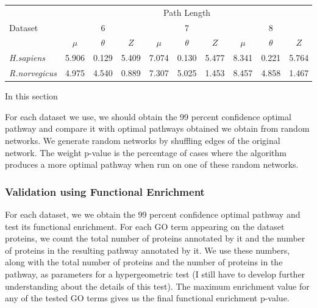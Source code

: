 \documentclass{ws-procs11x85}
\begin{document}
\begin{table}[t]
{
\begin{tabular}{|l|c|c|c|c|c|c|c|c|c|}
\hline
	&	\multicolumn{9}{c|}{Path Length}		\\ \cline{2-10}
Dataset	&	\multicolumn{3}{c|}{6}	&	\multicolumn{3}{c|}{7}	&
	\multicolumn{3}{c|}{8}	\\
	\cline{2-10} 
		&	\begin{math}\mu\end{math}	&	\begin{math}\theta\end{math}	&
	\begin{math}Z\end{math} & \begin{math}\mu\end{math}	&	\begin{math}\theta\end{math}	&
	\begin{math}Z\end{math} & \begin{math}\mu\end{math}	&
	\begin{math}\theta\end{math}	& \begin{math}Z\end{math}	\\ \hline
{\it H.sapiens}	&	5.906	&	0.129	&	5.409	&	7.074	&	0.130	&	5.477	&	8.341	&
0.221	&	5.764	\\
{\it R.norvegicus}	&	4.975	&	4.540	&	0.889	&	7.307	&	5.025	&	1.453	&
8.457	&	4.858	&	1.467
\\
\hline
\end{tabular}
}
\label{tab:zscore}
\end{table}

In this section

For each dataset we use, we should obtain the 99 percent confidence
optimal pathway and compare it with optimal pathways obtained we
obtain from random networks. We generate random networks by shuffling
edges of the original network. The weight p-value is the percentage of
cases where the algorithm produces a more optimal pathway when run on
one of these random networks.

\subsubsection{Validation using Functional Enrichment}
 For each dataset, we we obtain the 99 percent confidence optimal pathway and
 test its functional enrichment. For each GO term appearing on the dataset
 proteins, we count the total number of proteins annotated by it and the
 number of proteins in the resulting pathway annotated by it. We use these
 numbers, along with the total number of proteins and the number of proteins in
 the pathway, as parameters for a hypergeometric test (I still have to develop
 further understanding about the details of this test). The maximum enrichment
 value for any of the tested GO terms gives us the final functional enrichment
 p-value.
 
\end{document}
